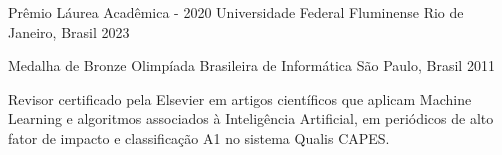 


\begin{cvhonors}

  \cvhonor
    {Prêmio Láurea Acadêmica - 2020} %
    {Universidade Federal Fluminense} %
    {Rio de Janeiro, Brasil} %
    {2023} %

\end{cvhonors}



\begin{cvhonors}

  \cvhonor
    {Medalha de Bronze} %
    {Olimpíada Brasileira de Informática} %
    {São Paulo, Brasil} %
    {2011} %

\end{cvhonors}



\begin{cvparagraph}
Revisor certificado pela Elsevier em artigos científicos que aplicam Machine Learning e algoritmos associados à Inteligência Artificial, em periódicos de alto fator de impacto e classificação A1 no sistema Qualis CAPES.
\end{cvparagraph} 
\vspace{-2mm}

